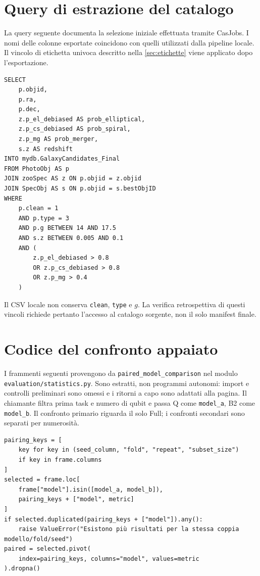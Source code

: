 \chapter{Query di estrazione del catalogo}
\label{app:query}

La query seguente documenta la selezione iniziale effettuata tramite
CasJobs. I nomi delle colonne esportate coincidono con quelli utilizzati
dalla pipeline locale. Il vincolo di etichetta univoca descritto nella
\cref{sec:etichette} viene applicato dopo l'esportazione.

\begin{verbatim}
SELECT
    p.objid,
    p.ra,
    p.dec,
    z.p_el_debiased AS prob_elliptical,
    z.p_cs_debiased AS prob_spiral,
    z.p_mg AS prob_merger,
    s.z AS redshift
INTO mydb.GalaxyCandidates_Final
FROM PhotoObj AS p
JOIN zooSpec AS z ON p.objid = z.objid
JOIN SpecObj AS s ON p.objid = s.bestObjID
WHERE
    p.clean = 1
    AND p.type = 3
    AND p.g BETWEEN 14 AND 17.5
    AND s.z BETWEEN 0.005 AND 0.1
    AND (
        z.p_el_debiased > 0.8
        OR z.p_cs_debiased > 0.8
        OR z.p_mg > 0.4
    )
\end{verbatim}

Il CSV locale non conserva \texttt{clean}, \texttt{type} e \(g\).
La verifica retrospettiva di questi vincoli richiede pertanto
l'accesso al catalogo sorgente, non il solo manifest finale.

\chapter{Codice del confronto appaiato}
\label{app:codice-appaiamento}

I frammenti seguenti provengono da \texttt{paired\_model\_comparison}
nel modulo \texttt{evaluation/statistics.py}. Sono estratti, non
programmi autonomi: import e controlli preliminari sono omessi e i
ritorni a capo sono adattati alla pagina. Il chiamante filtra prima
task e numero di qubit e passa Q come \texttt{model\_a}, B2 come
\texttt{model\_b}. Il confronto primario riguarda il solo Full;
i confronti secondari sono separati per numerosità.

\begin{code}
\begin{verbatim}
pairing_keys = [
    key for key in (seed_column, "fold", "repeat", "subset_size")
    if key in frame.columns
]
selected = frame.loc[
    frame["model"].isin([model_a, model_b]),
    pairing_keys + ["model", metric]
]
if selected.duplicated(pairing_keys + ["model"]).any():
    raise ValueError("Esistono più risultati per la stessa coppia modello/fold/seed")
paired = selected.pivot(
    index=pairing_keys, columns="model", values=metric
).dropna()
\end{verbatim}
\caption{Costruzione delle coppie e rifiuto delle osservazioni duplicate.}
\label{lst:paired-code}
\end{code}

